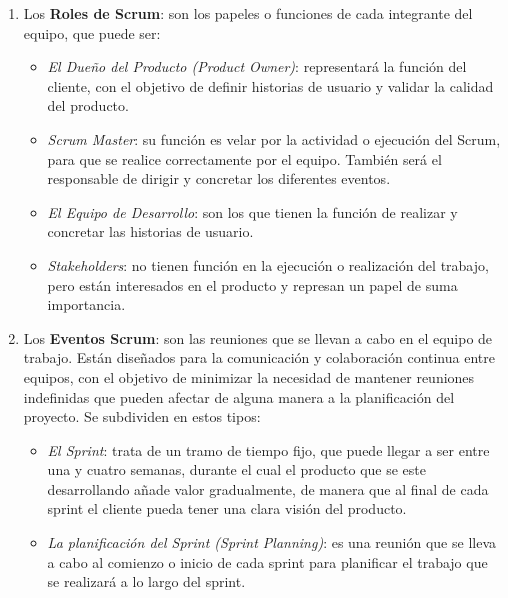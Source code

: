 \begin{enumerate}

    \item
    Los \textbf{Roles de Scrum}: son los papeles o funciones de cada integrante del equipo, que puede ser:
    
        \begin{itemize}
            \item
            \textit{El Dueño del Producto (Product Owner)}: representará la función del cliente, con el objetivo de definir historias de usuario y validar la calidad del producto.
    
            \item
            \textit{Scrum Master}: su función es velar por la actividad o ejecución del Scrum, para que se realice correctamente por el equipo. También será el responsable de dirigir y concretar los diferentes eventos.
    
            \item
            \textit{El Equipo de Desarrollo}: son los que tienen la función de realizar y concretar las historias de usuario.
    
            \item
            \textit{Stakeholders}: no tienen función en la ejecución o realización del trabajo, pero están interesados en el producto y represan un papel de suma importancia.
    
        \end{itemize}

    \item
    Los \textbf{Eventos Scrum}: son las reuniones que se llevan a cabo en el equipo de trabajo. Están diseñados para la comunicación y colaboración continua entre equipos, con el objetivo de minimizar la necesidad de mantener reuniones indefinidas que pueden afectar de alguna manera a la planificación del proyecto. Se subdividen en estos tipos:

        \begin{itemize}
            \item
            \textit{El Sprint}: trata de un tramo de tiempo fijo, que puede llegar a ser entre una y cuatro semanas, durante el cual el producto que se este desarrollando añade valor gradualmente, de manera que al final de cada sprint el cliente pueda tener una clara visión del producto.
    
            \item
            \textit{La planificación del Sprint (Sprint Planning)}: es una reunión que se lleva a cabo al comienzo o inicio de cada sprint para planificar el trabajo que se realizará a lo largo del sprint.
    

\end{itemize}
\end{enumerate}
